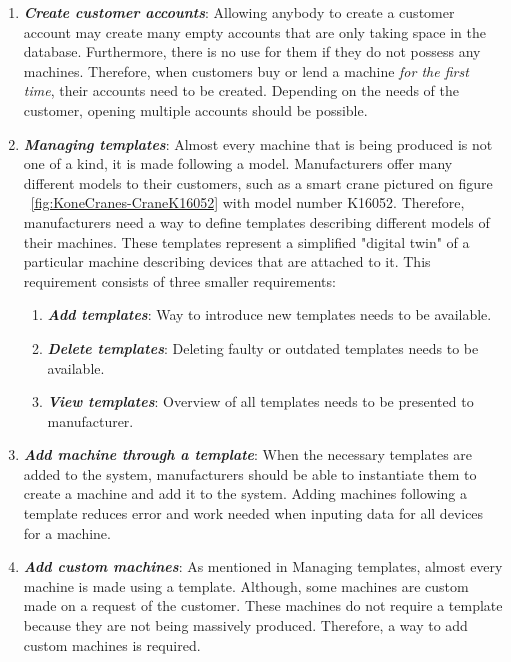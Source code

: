 \begin{enumerate}
	\setlength{\itemsep}{1pt}
	\item \textbf{\textit{Create customer accounts}}: Allowing anybody to create a customer account may create many empty accounts that are only taking space in the database. Furthermore, there is no use for them if they do not possess any machines. Therefore, when customers buy or lend a machine \emph{for the first time}, their accounts need to be created. Depending on the needs of the customer, opening multiple accounts should be possible. 

	\item \textbf{\textit{Managing templates}}: Almost every machine that is being produced is not one of a kind, it is made following a model. Manufacturers offer many different models to their customers, such as a smart crane pictured on figure ~\ref{fig:KoneCranes-CraneK16052} with model number K16052. Therefore, manufacturers need a way to define templates describing different models of their machines. These templates represent a simplified "digital twin" of a particular machine describing devices that are attached to it. This requirement consists of three smaller requirements:

	\begin{enumerate}
		\item \textbf{\textit{Add templates}}: Way to introduce new templates needs to be available.
		\item \textbf{\textit{Delete templates}}: Deleting faulty or outdated templates needs to be available.
		\item \textbf{\textit{View templates}}: Overview of all templates needs to be presented to manufacturer. 
	\end{enumerate}

	\item \textbf{\textit{Add machine through a template}}: When the necessary templates are added to the system, manufacturers should be able to instantiate them to create a machine and add it to the system. Adding machines following a template reduces error and work needed when inputing data for all devices for a machine.

	\item \textbf{\textit{Add custom machines}}: As mentioned in Managing templates, almost every machine is made using a template. Although, some machines are custom made on a request of the customer. These machines do not require a template because they are not being massively produced. Therefore, a way to add custom machines is required.


\end{enumerate}
